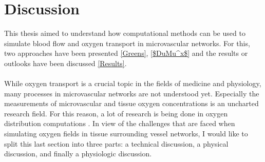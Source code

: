 

\newpage
\newpage
\section{Discussion}

This thesis aimed to understand how computational methods can be used to simulate blood flow and oxygen transport in microvascular networks. For this, two approaches have been presented \ref{Greens}, \ref{$DuMu^x$} and the results or outlooks have been discussed \ref{Results}.\\
\\While oxygen transport is a crucial topic in the fields of medicine and physiology, many processes in microvascular networks are not understood yet. Especially the measurements of microvascular and tissue oxygen concentrations is an uncharted research field. For this reason, a lot of research is being done in oxygen distribution computations \cite{goldman2001computational, lee2017accounting, kreuzer1982oxygen, secomb1993analysis} . In view of the challenges that are faced when simulating oxygen fields in tissue surrounding vessel networks, I would like to split this last section into three parts: a technical discussion, a physical discussion, and finally a physiologic discussion.

